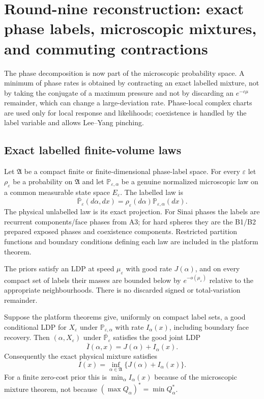 \section{Round-nine reconstruction: exact phase labels, microscopic mixtures, and commuting contractions}
\label{sec:r9-d1}

The phase decomposition is now part of the microscopic probability space.  A
minimum of phase rates is obtained by contracting an exact labelled mixture,
not by taking the conjugate of a maximum pressure and not by discarding an
$e^{-c\mu}$ remainder, which can change a large-deviation rate.  Phase-local
complex charts are used only for local response and likelihoods; coexistence
is handled by the label variable and allows Lee--Yang pinching.

\subsection{Exact labelled finite-volume laws}

Let $\mathfrak A$ be a compact finite or finite-dimensional phase-label space.
For every $\varepsilon$ let $\rho_\varepsilon$ be a probability on
$\mathfrak A$ and let
$\mathbb P_{\varepsilon,\alpha}$ be a genuine normalized microscopic law on a
common measurable state space $E_\varepsilon$.  The labelled law is
\[
 \overline{\mathbb P}_\varepsilon(d\alpha,dx)
 =\rho_\varepsilon(d\alpha)
  \mathbb P_{\varepsilon,\alpha}(dx).
\]
The physical unlabelled law is its exact projection.  For Sinai phases the
labels are recurrent components/face phases from A3; for hard spheres they are
the B1/B2 prepared exposed phases and coexistence components.  Restricted
partition functions and boundary conditions defining each law are included in
the platform theorem.

\begin{assumption}
\label{ass:r9-d1-prior}
The priors satisfy an LDP at speed $\mu_\varepsilon$ with good rate
$J(\alpha)$, and on every compact set of labels their masses are bounded below
by $e^{-o(\mu_\varepsilon)}$ relative to the appropriate neighbourhoods.
There is no discarded signed or total-variation remainder.
\end{assumption}

\begin{theorem}
\label{thm:r9-d1-joint}
Suppose the platform theorems give, uniformly on compact label sets, a good
conditional LDP for $X_\varepsilon$ under
$\mathbb P_{\varepsilon,\alpha}$ with rate $I_\alpha(x)$, including boundary
face recovery.  Then $(\alpha,X_\varepsilon)$ under
$\overline{\mathbb P}_\varepsilon$ satisfies the good joint LDP
\[
 \overline I(\alpha,x)=J(\alpha)+I_\alpha(x).
\]
Consequently the exact physical mixture satisfies
\[
 I(x)=\inf_{\alpha\in\mathfrak A}
 \{J(\alpha)+I_\alpha(x)\}.
\]
For a finite zero-cost prior this is $\min_\alpha I_\alpha(x)$ because of
the microscopic mixture theorem, not because
$(\max Q_\alpha)^*=\min Q_\alpha^*$.
\end{theorem}

